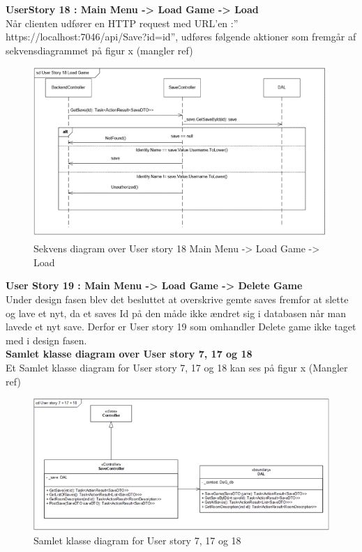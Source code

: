 \textbf{UserStory 18 : Main Menu -> Load Game -> Load}\\
Når clienten udfører en HTTP request med URL’en :” https://localhost:7046/api/Save?id={id}”, udføres følgende aktioner som fremgår af sekvensdiagrammet på figur x (mangler ref)\\

\begin{figure}[H]
\centering
\includegraphics[width = \textwidth]{02-Body/Images/Backend_sekvens_18.PNG}
\caption{Sekvens diagram over User story 18 Main Menu -> Load Game -> Load}
\label{fig:Design-Backend-Sekvens-18}
\end{figure}

\textbf{User Story 19 : Main Menu -> Load Game -> Delete Game}\\

Under design fasen blev det besluttet at overskrive gemte saves fremfor at slette og lave et nyt, da et saves Id på den måde ikke ændret sig i databasen når man lavede et nyt save. Derfor er User story 19 som omhandler Delete game ikke taget med i design fasen.\\

\textbf{Samlet klasse diagram over User story 7, 17 og 18}\\
Et Samlet klasse diagram for User story 7, 17 og 18 kan ses på figur x (Mangler ref)\\

\begin{figure}[H]
\centering
\includegraphics[width = \textwidth]{02-Body/Images/Backend_klasse_7_17_18.PNG}
\caption{Samlet klasse diagram for User story 7, 17 og 18}
\label{fig:Design-Backend-Sekvens-7-17-18}
\end{figure}

